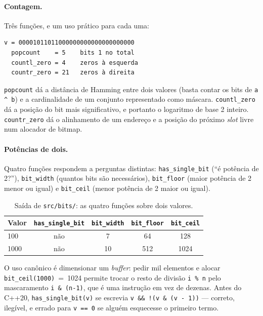\paragraph{Contagem.} Três funções, e um uso prático para cada uma:

\begin{lstlisting}[style=bt, language=bash,
    caption={Saída de \texttt{src/bits/}: contagem sobre um valor de 32 bits.}]
v = 00001011011000000000000000000000
  popcount    = 5    bits 1 no total
  countl_zero = 4    zeros à esquerda
  countr_zero = 21   zeros à direita
\end{lstlisting}

\texttt{popcount} dá a distância de Hamming entre dois valores (basta contar os
bits de \texttt{a \textasciicircum{} b}) e a cardinalidade de um conjunto
representado como máscara. \texttt{countl\_zero} dá a posição do bit mais
significativo, e portanto o logaritmo de base 2 inteiro.
\texttt{countr\_zero} dá o alinhamento de um endereço e a posição do próximo
\emph{slot} livre num alocador de bitmap.

\paragraph{Potências de dois.} Quatro funções respondem a perguntas distintas:
\texttt{has\_single\_bit} (``é potência de 2?''), \texttt{bit\_width} (quantos
bits são necessários), \texttt{bit\_floor} (maior potência de 2 menor ou igual)
e \texttt{bit\_ceil} (menor potência de 2 maior ou igual).

\begin{table}[htbp]
\centering
\caption{Saída de \texttt{src/bits/}: as quatro funções sobre dois valores.}
\label{tab:potencias-dois}
\footnotesize
\begin{tabular}{@{}lcccc@{}}
\toprule
\textbf{Valor} & \texttt{has\_single\_bit} & \texttt{bit\_width} & \texttt{bit\_floor} & \texttt{bit\_ceil} \\
\midrule
100  & não & 7  & 64  & 128 \\
1000 & não & 10 & 512 & 1024 \\
\bottomrule
\end{tabular}
\end{table}

O uso canônico é dimensionar um \emph{buffer}: pedir mil elementos e alocar
\texttt{bit\_ceil(1000)}~=~1024 permite trocar o resto de divisão
\texttt{i \% n} pelo mascaramento \texttt{i \& (n-1)}, que é uma instrução em
vez de dezenas. Antes do C++20, \texttt{has\_single\_bit(v)} se escrevia
\texttt{v \&\& !(v \& (v - 1))} --- correto, ilegível, e errado para
\texttt{v == 0} se alguém esquecesse o primeiro termo.

